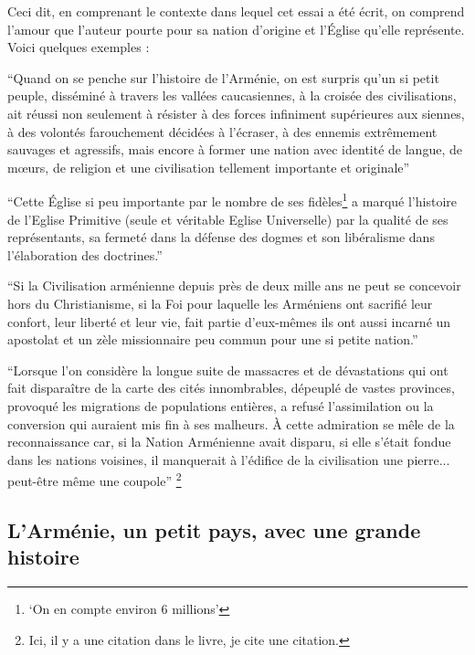 \documentclass[11pt, a4paper]{report}
\begin{document}
    Ceci dit, en comprenant le contexte dans lequel cet essai a été écrit, 
    on comprend l'amour que l'auteur pourte pour sa nation d'origine et l'Église qu'elle représente.
    Voici quelques exemples :
    
    \enquote{Quand on se penche sur l'histoire de l'Arménie, on est surpris qu'un si petit peuple, disséminé à travers les vallées caucasiennes,
    à la croisée des civilisations, ait réussi non seulement à résister à des forces infiniment supérieures aux siennes,
    à des volontés farouchement décidées à l'écraser, à des ennemis extrêmement sauvages et agressifs, 
    mais encore à former une nation avec identité de langue, de mœurs, 
    de religion et une civilisation tellement importante et originale}\cite{livre:principale}
    
    \enquote{Cette Église si peu importante par le nombre de ses fidèles\footnote{\enquote{On en compte environ 6 millions}\cite{livre:principale}}
    a marqué l'histoire de l'Eglise Primitive (seule et véritable Eglise Universelle) par la qualité de ses représentants,
    sa fermeté dans la défense des dogmes et son libéralisme dans l'élaboration des doctrines.}\cite{livre:principale}

    \enquote{Si la Civilisation arménienne depuis près de deux mille ans ne peut se concevoir hors du Christianisme, 
    si la Foi pour laquelle les Arméniens ont sacrifié leur confort, leur liberté et leur vie,
    fait partie d'eux-mêmes ils ont aussi incarné un apostolat et un zèle missionnaire peu commun pour une si petite nation.}\cite{livre:principale}

    \enquote{Lorsque l'on considère la longue suite de massacres et de dévastations qui ont fait disparaître de la carte des cités innombrables,
    dépeuplé de vastes provinces, provoqué les migrations de populations entières,
    a refusé l'assimilation ou la conversion qui auraient mis fin à ses malheurs. 
    À cette admiration se mêle de la reconnaissance car, si la Nation Arménienne avait disparu,
    si elle s'était fondue dans les nations voisines, 
    il manquerait à l'édifice de la civilisation une pierre... peut-être même une coupole}\cite{livre:principale,citation:alem}
    \footnote{Ici, il y a une citation dans le livre, je cite une citation.}

    \subsection*{L'Arménie, un petit pays, avec une grande histoire}
\end{document}
